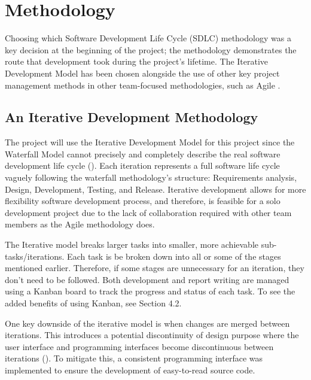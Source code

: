 \chapter{Methodology}
\label{chap:methodology}

Choosing which Software Development Life Cycle (SDLC) methodology was a key decision at the beginning of the project; the methodology demonstrates the route that development took during the project's lifetime. The Iterative Development Model has been chosen alongside the use of other key project management methods in other team-focused methodologies, such as Agile .

\section{An Iterative Development Methodology}
\label{methodology:chosen}

The project will use the Iterative Development Model for this project since the Waterfall Model cannot precisely and completely describe the real software development life cycle (\cite{dapeng_liu_case_2011}).
Each iteration represents a full software life cycle vaguely following the waterfall methodology's structure: Requirements analysis, Design, Development, Testing, and Release. Iterative development allows for more flexibility software development process, and therefore, is feasible for a solo development project due to the lack of collaboration required with other team members as the Agile methodology does.

The Iterative model breaks larger tasks into smaller, more achievable sub-tasks/iterations. Each task is be broken down into all or some of the stages mentioned earlier. Therefore, if some stages are unnecessary for an iteration, they don't need to be followed. Both development and report writing are managed using a Kanban board to track the progress and status of each task. To see the added benefits of using Kanban, see Section 4.2.

One key downside of the iterative model is when changes are merged between iterations. This introduces a potential discontinuity of design purpose where the user interface and programming interfaces become discontinuous between iterations (\cite{dapeng_liu_case_2011}). To mitigate this, a consistent programming interface was implemented to ensure the development of easy-to-read source code.